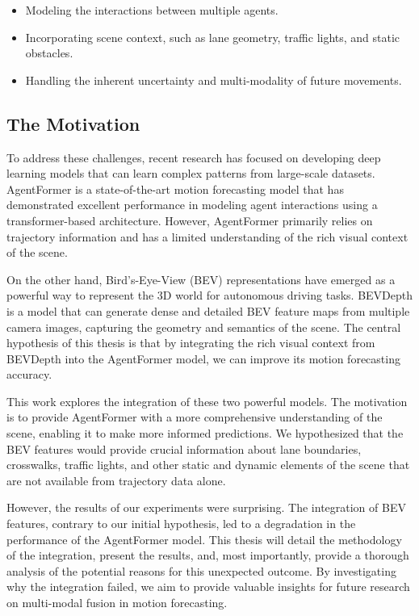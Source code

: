 \begin{itemize}
    \item Modeling the interactions between multiple agents.
    \item Incorporating scene context, such as lane geometry, traffic lights, and static obstacles.
    \item Handling the inherent uncertainty and multi-modality of future movements.
\end{itemize}

\subsection{The Motivation}

To address these challenges, recent research has focused on developing deep learning models that can learn complex patterns from large-scale datasets. AgentFormer is a state-of-the-art motion forecasting model that has demonstrated excellent performance in modeling agent interactions using a transformer-based architecture. However, AgentFormer primarily relies on trajectory information and has a limited understanding of the rich visual context of the scene.

On the other hand, Bird's-Eye-View (BEV) representations have emerged as a powerful way to represent the 3D world for autonomous driving tasks. BEVDepth is a model that can generate dense and detailed BEV feature maps from multiple camera images, capturing the geometry and semantics of the scene. The central hypothesis of this thesis is that by integrating the rich visual context from BEVDepth into the AgentFormer model, we can improve its motion forecasting accuracy.

This work explores the integration of these two powerful models. The motivation is to provide AgentFormer with a more comprehensive understanding of the scene, enabling it to make more informed predictions. We hypothesized that the BEV features would provide crucial information about lane boundaries, crosswalks, traffic lights, and other static and dynamic elements of the scene that are not available from trajectory data alone.

However, the results of our experiments were surprising. The integration of BEV features, contrary to our initial hypothesis, led to a degradation in the performance of the AgentFormer model. This thesis will detail the methodology of the integration, present the results, and, most importantly, provide a thorough analysis of the potential reasons for this unexpected outcome. By investigating why the integration failed, we aim to provide valuable insights for future research on multi-modal fusion in motion forecasting.